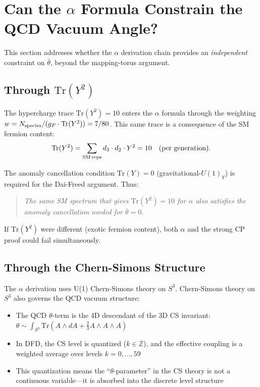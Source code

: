 \documentclass[11pt]{article}
\theoremstyle{remark}
\begin{document}
\section{Can the $\alpha$ Formula Constrain the QCD Vacuum Angle?}

This section addresses whether the $\alpha$ derivation chain provides an
\emph{independent} constraint on $\bar\theta$, beyond the mapping-torus
argument.

\subsection{Through $\mathrm{Tr}(Y^2)$}

The hypercharge trace $\mathrm{Tr}(Y^2) = 10$ enters the $\alpha$ formula
through the weighting $w = N_{\rm species}/(g_F \cdot \mathrm{Tr}(Y^2)) = 7/80$.
This same trace is a consequence of the SM fermion content:
\begin{equation}
\mathrm{Tr}(Y^2) = \sum_{\rm SM\,reps} d_3 \cdot d_2 \cdot Y^2 = 10
  \quad\text{(per generation)}.
\end{equation}

The anomaly cancellation condition $\mathrm{Tr}(Y) = 0$ (gravitational-$U(1)_Y$)
is required for the Dai-Freed argument.  Thus:
\begin{quote}
\emph{The same SM spectrum that gives $\mathrm{Tr}(Y^2) = 10$ for $\alpha$ also
satisfies the anomaly cancellation needed for $\bar\theta = 0$.}
\end{quote}
If $\mathrm{Tr}(Y^2)$ were different (exotic fermion content), both $\alpha$
and the strong CP proof could fail simultaneously.

\subsection{Through the Chern-Simons Structure}

The $\alpha$ derivation uses U(1) Chern-Simons theory on $S^3$.
Chern-Simons theory on $S^3$ also governs the QCD vacuum structure:
\begin{itemize}
\item The QCD $\theta$-term is the 4D descendant of the 3D CS invariant:
  $\theta \sim \int_{S^3} \mathrm{Tr}(A \wedge dA + \tfrac{2}{3} A \wedge A \wedge A)$
\item In DFD, the CS level is quantized ($k \in \mathbb{Z}$), and the
  effective coupling is a weighted average over levels $k = 0, \ldots, 59$
\item This quantization means the ``$\theta$-parameter'' in the CS theory is
  not a continuous variable---it is absorbed into the discrete level structure
\end{itemize}
\end{document}
